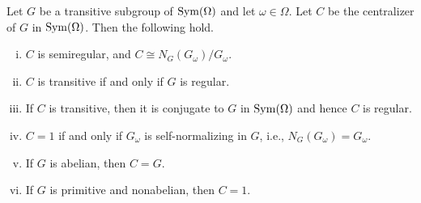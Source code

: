 \begin{theorem} \label{thm-centralizer-trans-perm-grp}
	Let $G$ be a transitive subgroup of $\operatorname{Sym}(\Omega)$ and let $\omega\in \Omega$. Let $C$ be the centralizer of $G$ in $\operatorname{Sym}(\Omega)$. Then the following hold.
	\begin{enumerate}[(i)]
		\item $C$ is semiregular, and $C \cong N_G(G_\omega)/G_\omega$.
		\item $C$ is transitive if and only if $G$ is regular.
		\item If $C$ is transitive, then it is conjugate to $G$ in $\operatorname{Sym}(\Omega)$ and hence $C$ is regular.
		\item $C = 1$ if and only if $G_\omega$ is self-normalizing in $G$, i.e., $N_G(G_\omega) = G_\omega$.
		\item If $G$ is abelian, then $C = G$.
		\item If $G$ is primitive and nonabelian, then $C = 1$.
	\end{enumerate}
\end{theorem}
